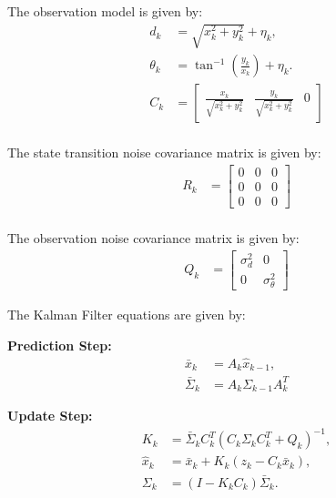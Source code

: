 \documentclass[answers]{exam}
\begin{document}
\begin{questions}
\begin{parts}
\begin{solution}
            The observation model is given by:
            \begin{align*}
                d_k      & = \sqrt{x_k^2 + y_k^2} + \eta_k,                                              \\
                \theta_k & = \tan^{-1}\left(\frac{y_k}{x_k}\right) + \eta_k.                             \\
                C_k      & = \begin{bmatrix}
                                 \frac{x_k}{\sqrt{x_k^2 + y_k^2}} & \frac{y_k}{\sqrt{x_k^2 + y_k^2}} & 0
                             \end{bmatrix} \\
            \end{align*}

            The state transition noise covariance matrix is given by:
            \begin{align*}
                R_k & = \begin{bmatrix}
                            0 & 0 & 0 \\
                            0 & 0 & 0 \\
                            0 & 0 & 0
                        \end{bmatrix} \\
            \end{align*}

            The observation noise covariance matrix is given by:
            \begin{align*}
                Q_k & = \begin{bmatrix}
                            \sigma^2_{d} & 0                 \\
                            0            & \sigma^2_{\theta}
                        \end{bmatrix}
            \end{align*}

            The Kalman Filter equations are given by:

            \textbf{Prediction Step:}
            \begin{align*}
                \bar{x}_{k}      & = A_{k} \hat{x}_{k-1},       \\
                \bar{\Sigma}_{k} & = A_{k} \Sigma_{k-1} A_{k}^T
            \end{align*}

            \textbf{Update Step:}
            \begin{align*}
                K_{k}       & = \bar{\Sigma}_{k} C_{k}^T \left(C_{k} \Sigma_{k} C_{k}^T + Q_{k}\right)^{-1}, \\
                \hat{x}_{k} & = \bar{x}_{k} + K_{k} \left(z_{k} - C_{k} \bar{x}_{k}\right),                  \\
                \Sigma_{k}  & = \left(I - K_{k} C_{k}\right) \bar{\Sigma}_{k}.
            \end{align*}
        \end{solution}


\end{parts}
\end{questions}
\end{document}
